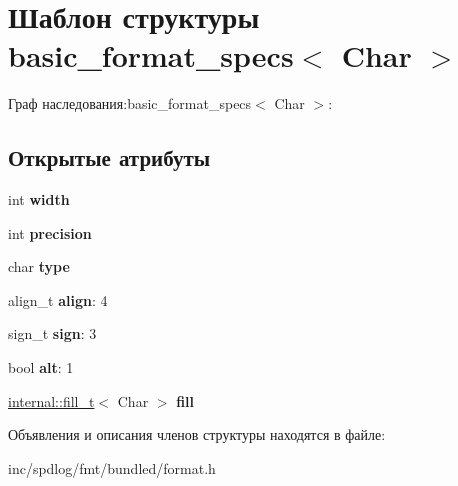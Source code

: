 \hypertarget{structbasic__format__specs}{}\section{Шаблон структуры basic\+\_\+format\+\_\+specs$<$ Char $>$}
\label{structbasic__format__specs}


Граф наследования\+:basic\+\_\+format\+\_\+specs$<$ Char $>$\+:
\subsection*{Открытые атрибуты}
\begin{DoxyCompactItemize}
\item 
\mbox{\label{structbasic__format__specs_ac05254b4b13aac586b98730d65d73b65}} 
int {\bfseries width}
\item 
\mbox{\label{structbasic__format__specs_a56147eaae543dbf9967f68ada088cc00}} 
int {\bfseries precision}
\item 
\mbox{\label{structbasic__format__specs_a3e5701aefaa9266a5a2d531f9789167d}} 
char {\bfseries type}
\item 
\mbox{\label{structbasic__format__specs_a19b57f324eb8ed2b6cc96329009b1612}} 
align\+\_\+t {\bfseries align}\+: 4
\item 
\mbox{\label{structbasic__format__specs_a06daac73c25f7975686f9c1f5d39ef1b}} 
sign\+\_\+t {\bfseries sign}\+: 3
\item 
\mbox{\label{structbasic__format__specs_a540259499cbd3ccbc3e43dd94aa3c188}} 
bool {\bfseries alt}\+: 1
\item 
\mbox{\label{structbasic__format__specs_aed3225ca4b2030a4047f2e06311a80c5}} 
\hyperlink{structinternal_1_1fill__t}{internal\+::fill\+\_\+t}$<$ Char $>$ {\bfseries fill}
\end{DoxyCompactItemize}


Объявления и описания членов структуры находятся в файле\+:\begin{DoxyCompactItemize}
\item 
inc/spdlog/fmt/bundled/format.\+h\end{DoxyCompactItemize}
